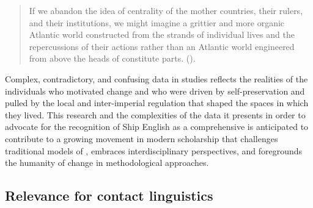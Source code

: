 \begin{quotation}
If we abandon the idea of centrality of the mother countries, their rulers, and their institutions, we might imagine a grittier and more organic Atlantic world constructed from the strands of individual lives and the repercussions of their actions rather than an Atlantic world engineered from above the heads of constitute parts. (\citealt{Daniels2015}).
\end{quotation}

Complex, contradictory, and confusing data in  studies reflects the realities of the individuals who motivated  change and who were driven by self-preservation and pulled by the local and inter-imperial regulation that shaped the spaces in which they lived. This research and the complexities of the data it presents in order to advocate for the recognition of Ship English as a comprehensive  is anticipated to contribute to a growing movement in modern scholarship that challenges traditional models of , embraces interdisciplinary perspectives, and foregrounds the humanity of  change in methodological approaches. 

\subsection{{Relevance for contact linguistics}}%

